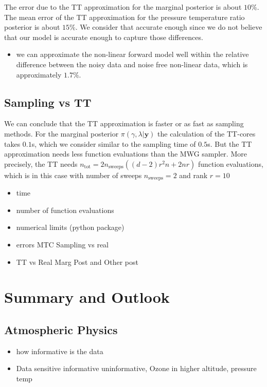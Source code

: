 The error due to the TT approximation for the marginal posterior is about $10\%$.
The mean error of the TT approximation for the pressure temperature ratio posterior is about $15\%$.
We consider that accurate enough since we do not believe that our model is accurate enough to capture those differences.

\begin{itemize}
	\item  we can approximate the non-linear forward model well within the relative difference between the noisy data and noise free non-linear data, which is approximately $ 1.7 \%$.
\end{itemize}

\section{Sampling vs TT}
We can conclude that the TT approximation is faster or as fast as sampling methods.
For the marginal posterior $\pi(\gamma, \lambda | \bm{y})$ the calculation of the TT-cores takes $0.1$s, which we consider similar to the sampling time of $0.5$s.
But the TT approximation needs less function evaluations than the MWG sampler.
More precisely, the TT needs $n_{\text{tot}} = 2n_{\text{sweeps}}((d-2)r^2n+ 2nr) $ function evaluations, which is in this case with number of sweeps $n_{\text{sweeps}} =2$ and rank $r=10$
\begin{itemize}
	\item time
	\item number of function evaluations
	\item numerical limits (python package)
	\item errors MTC Sampling vs real
	\item TT vs Real Marg Post and Other post
\end{itemize}



\chapter{Summary and Outlook}
\label{ch:SumOut}
\section{Atmospheric Physics}
\begin{itemize}
	\item how informative is the data
	\item Data sensitive informative uninformative, Ozone in higher altitude, pressure  temp \cite{}
\end{itemize}

